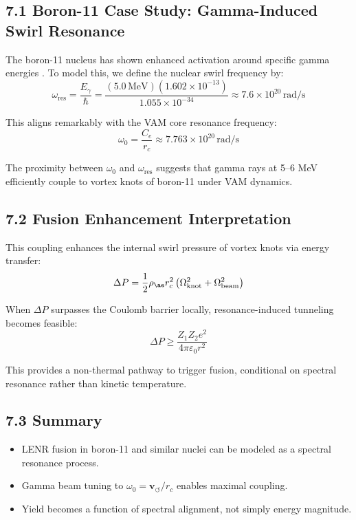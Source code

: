 \subsection*{7.1 Boron-11 Case Study: Gamma-Induced Swirl Resonance}

The boron-11 nucleus has shown enhanced activation around specific gamma energies \cite{Goryachev2020}. To model this, we define the nuclear swirl frequency by:
\begin{equation}
\omega_{\text{res}} = \frac{E_{\gamma}}{\hbar} = \frac{(5.0 \, \text{MeV})(1.602 \times 10^{-13})}{1.055 \times 10^{-34}} \approx 7.6 \times 10^{20} \, \text{rad/s}
\end{equation}

This aligns remarkably with the VAM core resonance frequency:
\[ \omega_0 = \frac{C_e}{r_c} \approx 7.763 \times 10^{20} \, \text{rad/s} \]

The proximity between $\omega_0$ and $\omega_{\text{res}}$ suggests that gamma rays at 5--6 MeV efficiently couple to vortex knots of boron-11 under VAM dynamics.

\subsection*{7.2 Fusion Enhancement Interpretation}

This coupling enhances the internal swirl pressure of vortex knots via energy transfer:
\begin{equation}
\Delta P = \frac{1}{2} \rho_{\ae} r_c^2 \left( \Omega_{\text{knot}}^2 + \Omega_{\text{beam}}^2 \right)
\end{equation}

When $\Delta P$ surpasses the Coulomb barrier locally, resonance-induced tunneling becomes feasible:
\begin{equation}
\Delta P \geq \frac{Z_1 Z_2 e^2}{4\pi \varepsilon_0 r^2}
\end{equation}

This provides a non-thermal pathway to trigger fusion, conditional on spectral resonance rather than kinetic temperature.

\subsection*{7.3 Summary}

\begin{itemize}
  \item LENR fusion in boron-11 and similar nuclei can be modeled as a spectral resonance process.
  \item Gamma beam tuning to $\omega_0 = \mathbf{v}_{\scriptscriptstyle\boldsymbol{\circlearrowleft}} / r_c$ enables maximal coupling.
  \item Yield becomes a function of spectral alignment, not simply energy magnitude.
\end{itemize}

